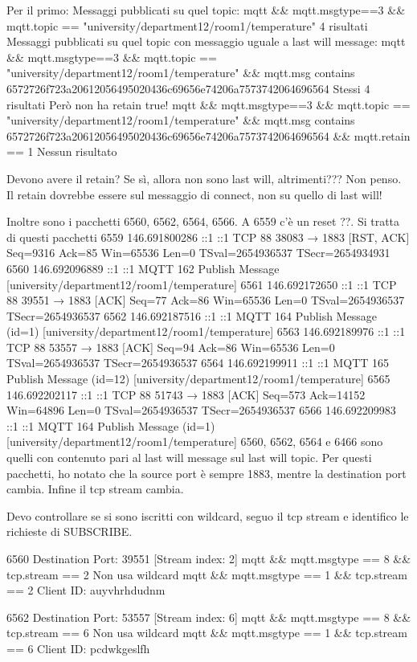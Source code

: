 Per il primo:
Messaggi pubblicati su quel topic:
mqtt \&\& mqtt.msgtype==3 \&\& mqtt.topic == "university/department12/room1/temperature" 
4 risultati
Messaggi pubblicati su quel topic con messaggio uguale a last will message:
mqtt \&\& mqtt.msgtype==3 \&\& mqtt.topic == "university/department12/room1/temperature" \&\& mqtt.msg contains 6572726f723a20612056495020436c69656e74206a7573742064696564
Stessi 4 risultati
Però non ha retain true!
mqtt \&\& mqtt.msgtype==3 \&\& mqtt.topic == "university/department12/room1/temperature" \&\& mqtt.msg contains 6572726f723a20612056495020436c69656e74206a7573742064696564 \&\& mqtt.retain == 1
Nessun risultato

Devono avere il retain? Se sì, allora non sono last will, altrimenti???
Non penso. Il retain dovrebbe essere sul messaggio di connect, non su quello di last will!

Inoltre sono i pacchetti 6560, 6562, 6564, 6566. A 6559 c'è un reset ??.
Si tratta di questi pacchetti 
6559	146.691800286	::1	::1	TCP	88	38083 → 1883 [RST, ACK] Seq=9316 Ack=85 Win=65536 Len=0 TSval=2654936537 TSecr=2654934931
6560	146.692096889	::1	::1	MQTT	162	Publish Message [university/department12/room1/temperature]
6561	146.692172650	::1	::1	TCP	88	39551 → 1883 [ACK] Seq=77 Ack=86 Win=65536 Len=0 TSval=2654936537 TSecr=2654936537
6562	146.692187516	::1	::1	MQTT	164	Publish Message (id=1) [university/department12/room1/temperature]
6563	146.692189976	::1	::1	TCP	88	53557 → 1883 [ACK] Seq=94 Ack=86 Win=65536 Len=0 TSval=2654936537 TSecr=2654936537
6564	146.692199911	::1	::1	MQTT	165	Publish Message (id=12) [university/department12/room1/temperature]
6565	146.692202117	::1	::1	TCP	88	51743 → 1883 [ACK] Seq=573 Ack=14152 Win=64896 Len=0 TSval=2654936537 TSecr=2654936537
6566	146.692209983	::1	::1	MQTT	164	Publish Message (id=1) [university/department12/room1/temperature]
6560, 6562, 6564 e 6466 sono quelli con contenuto pari al last will message sul last will topic.
Per questi pacchetti, ho notato che la source port è sempre 1883, mentre la destination port cambia.
Infine il tcp stream cambia.

Devo controllare se si sono iscritti con wildcard, seguo il tcp stream e identifico le richieste di SUBSCRIBE.

6560
Destination Port: 39551
[Stream index: 2]
mqtt \&\& mqtt.msgtype == 8 \&\& tcp.stream == 2
Non usa wildcard
mqtt \&\& mqtt.msgtype == 1 \&\& tcp.stream == 2
Client ID: auyvhrhdudnm

6562
Destination Port: 53557
[Stream index: 6]
mqtt \&\& mqtt.msgtype == 8 \&\& tcp.stream == 6
Non usa wildcard
mqtt \&\& mqtt.msgtype == 1 \&\& tcp.stream == 6
Client ID: pcdwkgeslfh

